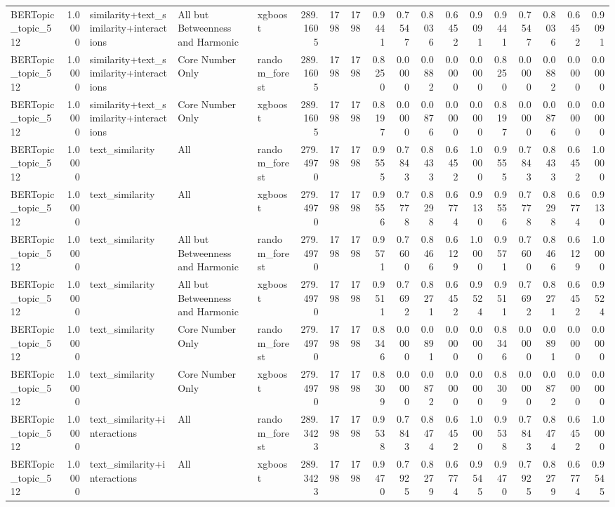 \begin{tabular}{lrlllrrrrrrrrrrrrr}
BERTopic_topic_512 & 1.0000 & similarity+text_similarity+interactions & All but Betweenness and Harmonic & xgboost & 289.1605 & 1798 & 1798 & 0.9441 & 0.7547 & 0.8036 & 0.6452 & 0.9091 & 0.9441 & 0.7547 & 0.8036 & 0.6452 & 0.9091 \\
BERTopic_topic_512 & 1.0000 & similarity+text_similarity+interactions & Core Number Only & random_forest & 289.1605 & 1798 & 1798 & 0.8250 & 0.0000 & 0.0882 & 0.0000 & 0.0000 & 0.8250 & 0.0000 & 0.0882 & 0.0000 & 0.0000 \\
BERTopic_topic_512 & 1.0000 & similarity+text_similarity+interactions & Core Number Only & xgboost & 289.1605 & 1798 & 1798 & 0.8197 & 0.0000 & 0.0876 & 0.0000 & 0.0000 & 0.8197 & 0.0000 & 0.0876 & 0.0000 & 0.0000 \\
BERTopic_topic_512 & 1.0000 & text_similarity & All & random_forest & 279.4970 & 1798 & 1798 & 0.9555 & 0.7843 & 0.8433 & 0.6452 & 1.0000 & 0.9555 & 0.7843 & 0.8433 & 0.6452 & 1.0000 \\
BERTopic_topic_512 & 1.0000 & text_similarity & All & xgboost & 279.4970 & 1798 & 1798 & 0.9556 & 0.7778 & 0.8298 & 0.6774 & 0.9130 & 0.9556 & 0.7778 & 0.8298 & 0.6774 & 0.9130 \\
BERTopic_topic_512 & 1.0000 & text_similarity & All but Betweenness and Harmonic & random_forest & 279.4970 & 1798 & 1798 & 0.9571 & 0.7600 & 0.8466 & 0.6129 & 1.0000 & 0.9571 & 0.7600 & 0.8466 & 0.6129 & 1.0000 \\
BERTopic_topic_512 & 1.0000 & text_similarity & All but Betweenness and Harmonic & xgboost & 279.4970 & 1798 & 1798 & 0.9511 & 0.7692 & 0.8271 & 0.6452 & 0.9524 & 0.9511 & 0.7692 & 0.8271 & 0.6452 & 0.9524 \\
BERTopic_topic_512 & 1.0000 & text_similarity & Core Number Only & random_forest & 279.4970 & 1798 & 1798 & 0.8346 & 0.0000 & 0.0891 & 0.0000 & 0.0000 & 0.8346 & 0.0000 & 0.0891 & 0.0000 & 0.0000 \\
BERTopic_topic_512 & 1.0000 & text_similarity & Core Number Only & xgboost & 279.4970 & 1798 & 1798 & 0.8309 & 0.0000 & 0.0872 & 0.0000 & 0.0000 & 0.8309 & 0.0000 & 0.0872 & 0.0000 & 0.0000 \\
BERTopic_topic_512 & 1.0000 & text_similarity+interactions & All & random_forest & 289.3423 & 1798 & 1798 & 0.9538 & 0.7843 & 0.8474 & 0.6452 & 1.0000 & 0.9538 & 0.7843 & 0.8474 & 0.6452 & 1.0000 \\
BERTopic_topic_512 & 1.0000 & text_similarity+interactions & All & xgboost & 289.3423 & 1798 & 1798 & 0.9470 & 0.7925 & 0.8279 & 0.6774 & 0.9545 & 0.9470 & 0.7925 & 0.8279 & 0.6774 & 0.9545 \\

\end{tabular}
